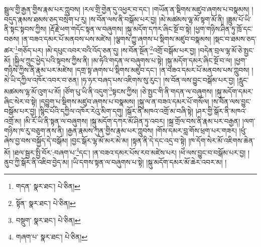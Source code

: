 སྦྲུལ་གྱི་རྒྱན་གྱིས་རྣམ་པར་ཀླུབས། །རལ་གྲི་གྱེན་དུ་འཕྱར་བ་དང་། །གཡོན་ན་སྡིགས་མཛུབ་ཞགས་པ་བསྣམས། །བདུད་རྣམས་ཐམས་ཅད་བསྲེག་པ་རུ། །ས་བོན་ལས་ནི་བསྒོམ་པར་བྱ། །མེ་མཚམས་ལྷ་མོ་སྟག་མོ་ནི། །ཟླུམ་པོ་ཡི་ནི་སྟང་སྟབས་ཀྱིས། །རྡོ་རྗེ་ཕག་གདོང་སྟན་ལ་བཞུགས། །སྐུ་མདོག་དཀར་ཞིང་སྔོ་བ་སྟེ། །ཕྱག་གཉིས་ཤིན་ཏུ་ཁྲོ་དང་བཅས། །ན་བཟའ་དམར་པོ་མནབས་པས་མཛེས། །ལྕགས་ཀྱུ་ཞགས་པ་སྡིགས་མཛུབ་བསྣམས། །སྡང་བ་ཐམས་ཅད་ཚར་\footnote{གདན་  སྣར་ཐང་།  པེ་ཅིན། }གཅོད་པར། །མེ་དཔུང་འབར་བའི་འོད་ཅན་དུ། །ས་བོན་སྔོན་\footnote{སྟོན་  སྣར་ཐང་།  པེ་ཅིན། }འགྲོ་བསྒོམ་པར་བྱ། །བདེན་བྲལ་ལྷ་མོ་ཅེ་སྤྱང་མོ། །སྐྱིལ་ཀྲུང་ཕྱེད་པའི་སྟབས་ཀྱིས་ནི། །མ་ཧེའི་གདན་ལ་བཞུགས་པ་སྟེ། །སྐུ་མདོག་དམར་ཞིང་སྔོ་བ་ལ། །ཕྱག་གཉིས་ཀྱིས་ནི་རྣམ་པར་མཛེས། །དགྲ་སྟ་ཞགས་པ་སྡིགས་མཛུབ་དང་། །ན་བཟའ་དམར་པོ་མནབས་པས་ཀླུབས། །མེ་ཡི་དཀྱིལ་འཁོར་འབར་བ་ཅན། །ཧ་ཧར་བཞད་པས་འཇིགས་སུ་རུང་། །ས་བོན་ལས་བྱུང་བསྒོམ་པར་བྱ། །རླུང་མཚམས་ལྷ་མོ་འུག་པ་མོ། །ཙོག་པུ་ཡི་ནི་འདུག་\footnote{བསྡུག་  སྣར་ཐང་།  པེ་ཅིན། }སྟངས་ཀྱིས། །ཅེ་སྤྱང་གི་ནི་གདན་ལ་བཞུགས། །སྐུ་མདོག་དམར་ཞིང་སེར་བ་སྟེ། །དབྱུག་པ་སྡིགས་མཛུབ་ཞགས་པ་བསྣམས། །སྐུ་ལ་ན་བཟའ་དམར་པོ་གསོལ། །ས་བོན་ལས་བྱུང་བསྒོམ་པར་བྱ། །སྙིང་པོའི་དཀྱིལ་འཁོར་རེའུ་མིག་དགུ། །སྒོར་ནི་མཁའ་འགྲོ་མ་བཞི་སྟེ། །ཤར་གྱི་སྒོར་ནི་མཁའ་འགྲོ་མ། །མི་རོ་ཡི་ནི་སྟན་ལ་བཞུགས། །སྐུ་མདོག་དཀར་མོ་ཤིན་ཏུ་འབར། །སྐྲ་གྲོལ་བས་ནི་རྣམ་པར་བརྒྱན། །ལག་གཉིས་ཁ་རུ་བཅུག་ནས་ནི། །རྒྱན་རྣམས་ཀུན་གྱིས་རྣམ་པར་ཀླུབས། །གོས་དམར་བླ་གོས་ཕྲག་པར་གཟར། །ཕུཾ་ཞེས་བྱ་བས་བསྐྱོད་དེ་བསྒོམ། །བྱང་སྒོར་ལྷ་མོ་མར་མེ་མ། །སྟན་ནི་དེ་དང་འདྲ་བ་སྟེ། །ཁ་དོག་སེར་མོ་འཇིགས་ཆེན་མོ། །ཐལ་སྦྱར་སྤྱི་བོར་:བཞག་པ་\footnote{གཞག་པ་  སྣར་ཐང་།  པེ་ཅིན། }དང་། །ན་བཟའ་དམར་པོས་རབ་མཛེས་པར། །ཕེཾ་ལས་བྱུང་བ་བསྒོམ་པར་བྱ། །ནུབ་ཀྱི་སྒོར་ནི་འཇིབ་བྱེད་མ། །ཡི་དགས་སྟན་ལ་བཞུགས་པ་སྟེ། །སྐུ་མདོག་དམར་མོ་ཆེར་འབར་མ། །
